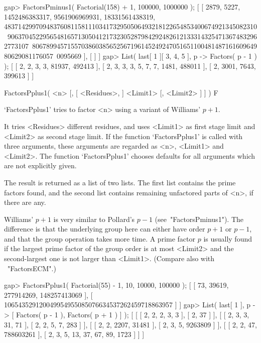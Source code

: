 \beginexample
gap> FactorsPminus1( Factorial(158) + 1, 100000, 1000000 );
[ [ 2879, 5227, 1452486383317, 9561906969931, 18331561438319, 
      483714299709483760811581110341732950506493218122654853400674921345082310\
906370452295654816571305041217323052879842924826121333143254713674832962773107\
806789945715570386038565256719614524924705165110048148716160964980629081176057\
0095669 ], [  ] ]
gap> List( last[ 1 ]{[ 3, 4, 5 ]}, p -> Factors( p - 1 ) );
[ [ 2, 2, 3, 3, 81937, 492413 ], [ 2, 3, 3, 3, 5, 7, 7, 1481, 488011 ], 
  [ 2, 3001, 7643, 399613 ] ]
\endexample


\>FactorsPplus1( <n> [, [ <Residues>, ] <Limit1> [, <Limit2> ] ] ) F

`FactorsPplus1' tries to factor <n> using a variant of Williams' $p+1$.

It tries <Residues> different residues, and uses <Limit1>
as first stage limit and <Limit2> as second stage limit.
If the function `FactorsPplus1' is called with three arguments,
these arguments are regarded as <n>, <Limit1> and <Limit2>.
The function `FactorsPplus1' chooses defaults for all arguments
which are not explicitly given.

The result is returned as a list of two lists. The first list
contains the prime factors found, and the second list contains
remaining unfactored parts of <n>, if there are any.

Williams' $p+1$ is very similar to Pollard's $p-1$
(see~"FactorsPminus1"). The difference is that the underlying group
here can either have order $p+1$ or $p-1$, and that the group
operation takes more time.
A prime factor $p$ is usually found if the largest prime factor
of the group order is at most <Limit2> and the second-largest one is
not larger than <Limit1>. (Compare also with ~"FactorsECM".)

\beginexample
gap> FactorsPplus1( Factorial(55) - 1, 10, 10000, 100000 );
[ [ 73, 39619, 277914269, 148257413069 ], 
  [ 106543529120049954955085076634537262459718863957 ] ]
gap> List( last[ 1 ], p -> [ Factors( p - 1 ), Factors( p + 1 ) ] );
[ [ [ 2, 2, 2, 3, 3 ], [ 2, 37 ] ], 
  [ [ 2, 3, 3, 31, 71 ], [ 2, 2, 5, 7, 283 ] ], 
  [ [ 2, 2, 2207, 31481 ], [ 2, 3, 5, 9263809 ] ], 
  [ [ 2, 2, 47, 788603261 ], [ 2, 3, 5, 13, 37, 67, 89, 1723 ] ] ]
\endexample



